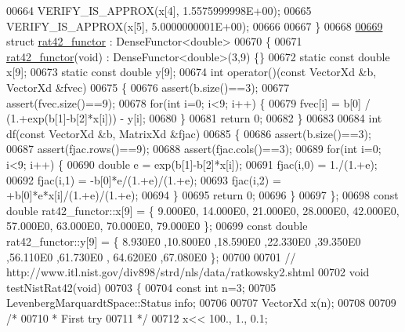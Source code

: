 \begin{DoxyCode}
00664   VERIFY\_IS\_APPROX(x[4], 1.5575999998E+00);
00665   VERIFY\_IS\_APPROX(x[5], 5.0000000001E+00);
00666 
00667 \}
00668 
\hyperlink{structrat42__functor}{00669} \textcolor{keyword}{struct }\hyperlink{structrat42__functor}{rat42\_functor} : DenseFunctor<double>
00670 \{
00671     \hyperlink{structrat42__functor}{rat42\_functor}(\textcolor{keywordtype}{void}) : DenseFunctor<double>(3,9) \{\}
00672     \textcolor{keyword}{static} \textcolor{keyword}{const} \textcolor{keywordtype}{double} x[9];
00673     \textcolor{keyword}{static} \textcolor{keyword}{const} \textcolor{keywordtype}{double} y[9];
00674     \textcolor{keywordtype}{int} operator()(\textcolor{keyword}{const} VectorXd &b, VectorXd &fvec)
00675     \{
00676         assert(b.size()==3);
00677         assert(fvec.size()==9);
00678         \textcolor{keywordflow}{for}(\textcolor{keywordtype}{int} i=0; i<9; i++) \{
00679             fvec[i] = b[0] / (1.+exp(b[1]-b[2]*x[i])) - y[i];
00680         \}
00681         \textcolor{keywordflow}{return} 0;
00682     \}
00683 
00684     \textcolor{keywordtype}{int} df(\textcolor{keyword}{const} VectorXd &b, MatrixXd &fjac)
00685     \{
00686         assert(b.size()==3);
00687         assert(fjac.rows()==9);
00688         assert(fjac.cols()==3);
00689         \textcolor{keywordflow}{for}(\textcolor{keywordtype}{int} i=0; i<9; i++) \{
00690             \textcolor{keywordtype}{double} e = exp(b[1]-b[2]*x[i]);
00691             fjac(i,0) = 1./(1.+e);
00692             fjac(i,1) = -b[0]*e/(1.+e)/(1.+e);
00693             fjac(i,2) = +b[0]*e*x[i]/(1.+e)/(1.+e);
00694         \}
00695         \textcolor{keywordflow}{return} 0;
00696     \}
00697 \};
00698 \textcolor{keyword}{const} \textcolor{keywordtype}{double} rat42\_functor::x[9] = \{ 9.000E0, 14.000E0, 21.000E0, 28.000E0, 42.000E0, 57.000E0, 63.000E0, 
      70.000E0, 79.000E0 \};
00699 \textcolor{keyword}{const} \textcolor{keywordtype}{double} rat42\_functor::y[9] = \{ 8.930E0 ,10.800E0 ,18.590E0 ,22.330E0 ,39.350E0 ,56.110E0 ,61.730E0 ,
      64.620E0 ,67.080E0 \};
00700 
00701 \textcolor{comment}{// http://www.itl.nist.gov/div898/strd/nls/data/ratkowsky2.shtml}
00702 \textcolor{keywordtype}{void} testNistRat42(\textcolor{keywordtype}{void})
00703 \{
00704   \textcolor{keyword}{const} \textcolor{keywordtype}{int} n=3;
00705   LevenbergMarquardtSpace::Status info;
00706 
00707   VectorXd x(n);
00708 
00709   \textcolor{comment}{/*}
00710 \textcolor{comment}{   * First try}
00711 \textcolor{comment}{   */}
00712   x<< 100., 1., 0.1;

\end{DoxyCode}

